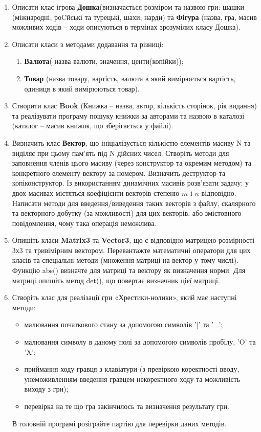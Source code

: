 \documentclass[a5paper,titlepage,openany,twoside,draft]{book_unv}%
\makeatletter
\newcommand{\xslalph}[1]{\expandafter\@xslalph\csname c@#1\endcsname}
\newcommand{\@xslalph}[1]{%
    \ifcase#1\or а\or б\or в\or г\or д\or e\or є\or ж\or з\or i%
    \or й\or к\or л\or м\or н\or о\or п\or р\or с\or т%
    \or у\or ф\or х\or ц\or ч\or ш\or ю\or я\or аа\or бб\or вв%
    \else\@ctrerr\fi%
}
\makeatother
\begin{document}
\begin{enumerate}
\item
  Описати клас ігрова \textbf{Дошка}(визначається розміром та назвою
  гри: шашки (міжнародні, роCйські та турецькі, шахи, нарди) та
  \textbf{Фігура} (назва, гра, масив можливих ходів -- ходи описуються в
  термінах зрозумілих класу Дошка).

\item
  Описати класи з методами додавання та різниці:
\begin{enumerate}[label=\xslalph*)]
\item \textbf{Валюта}( назва валюти, значення, центи(копійки));
\item \textbf{Товар} (назва товару, вартість, валюта в який вимірюється
вартість, одиниця в який вимірюються товар).
\end{enumerate}

\item
  Створити клас \textbf{Book} (Книжка -- назва, автор, кількість сторінок, рік
  видання) та реалізувати програму пошуку книжки за авторами та назвою в
  каталозі (каталог -- масив книжок, що зберігається у файлі).
  
\item
  Визначить клас \textbf{Вектор}, що ініціалізується кількістю елементів масиву N
  та виділяє при цьому пам'ять під N дійсних чисел. Створіть методи для
  заповнення членів цього масиву (через конструктор та окремим методом)
  та конкретного елементу вектору за номером. Визначить деструктор та
  копіконструктор. Із використанням динамічних масивів розв'язати
  задачу: у двох масивах містяться коефіцієнти векторів степеню $m$ і $n$
  відповідно. Написати методи для введення/виведення таких векторів з файлу,
  скалярного та векторного добутку (за можливості) для цих векторів, або
 змістовного повідомлення, чому така операція неможлива.
 
\item
  Опишіть класи \textbf{Matrix3} та \textbf{Vector3}, що є відповідно матрицею розмірності
  3х3 та тривімірним вектором. Перевантажте математичні оператори для
  цих класів та спеціальні методи (множення матриці на вектор у тому
  числі). Функцію abs() визначте для матриці та вектору як визначення
  норми. Для матриці опишіть метод det(), що повертає визначник цієї
  матриці.

\item
Створіть клас для реалізації гри «Хрестики-нолики», який має наступні методи: 
\begin{itemize}
\item
малювання початкового стану за допомогою символів '|' та '\_'; 
\item
малювання символу в даному полі за допомогою символів пробілу, 'O' та 'X'; 
\item
приймання ходу гравця з клавіатури (з превіркою коректності вводу, 
унеможивленням введення гравцем некоректного ходу та можливість виходу з гри);
\item
перевірка на те що гра закінчилось та визначення результату гри. 
\end{itemize}
В головній програмі розіграйте партію для перевірки даних методів.


\end{enumerate}
\end{document}

